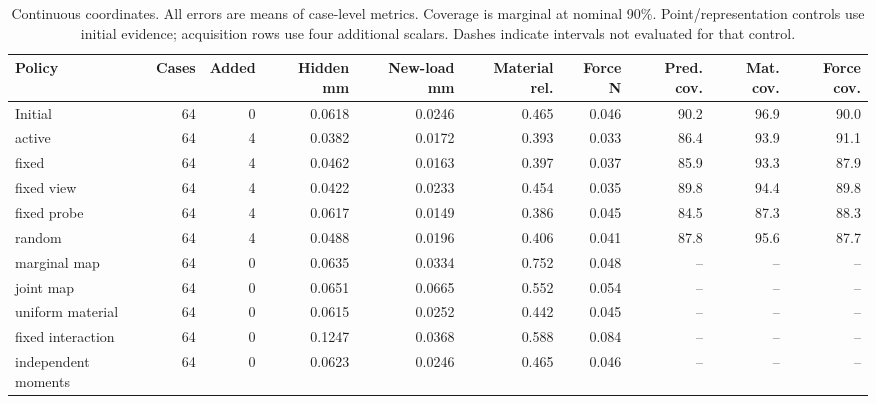 \begin{table}[!t]\centering\small\setlength{\tabcolsep}{4pt}
\caption{Continuous coordinates. All errors are means of case-level metrics. Coverage is marginal at nominal 90\%. Point/representation controls use initial evidence; acquisition rows use four additional scalars. Dashes indicate intervals not evaluated for that control.}
\begin{tabular}{lrrrrrrrrr}\toprule
Policy & Cases & Added & Hidden mm & New-load mm & Material rel. & Force N & Pred. cov. & Mat. cov. & Force cov.\\\midrule
Initial & 64 & 0 & 0.0618 & 0.0246 & 0.465 & 0.046 & 90.2 & 96.9 & 90.0\\
active & 64 & 4 & 0.0382 & 0.0172 & 0.393 & 0.033 & 86.4 & 93.9 & 91.1\\
fixed & 64 & 4 & 0.0462 & 0.0163 & 0.397 & 0.037 & 85.9 & 93.3 & 87.9\\
fixed view & 64 & 4 & 0.0422 & 0.0233 & 0.454 & 0.035 & 89.8 & 94.4 & 89.8\\
fixed probe & 64 & 4 & 0.0617 & 0.0149 & 0.386 & 0.045 & 84.5 & 87.3 & 88.3\\
random & 64 & 4 & 0.0488 & 0.0196 & 0.406 & 0.041 & 87.8 & 95.6 & 87.7\\
marginal map & 64 & 0 & 0.0635 & 0.0334 & 0.752 & 0.048 & -- & -- & --\\
joint map & 64 & 0 & 0.0651 & 0.0665 & 0.552 & 0.054 & -- & -- & --\\
uniform material & 64 & 0 & 0.0615 & 0.0252 & 0.442 & 0.045 & -- & -- & --\\
fixed interaction & 64 & 0 & 0.1247 & 0.0368 & 0.588 & 0.084 & -- & -- & --\\
independent moments & 64 & 0 & 0.0623 & 0.0246 & 0.465 & 0.046 & -- & -- & --\\
\bottomrule\end{tabular}
\end{table}

